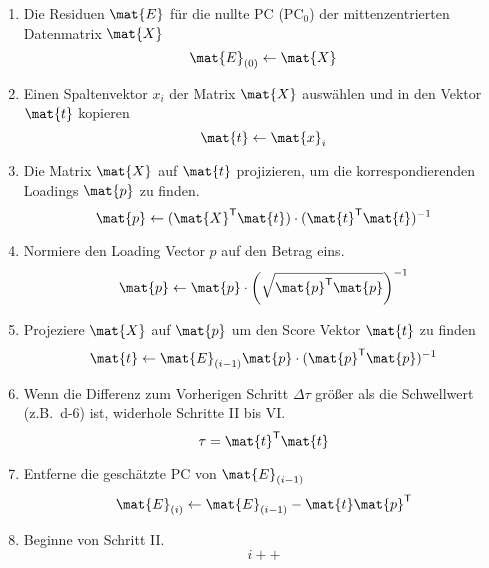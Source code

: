 \begin{enumerate}
    \item Die Residuen $\mat{E}$ für die nullte \gls{PC} ($\mathrm{PC}_0$) der mittenzentrierten Datenmatrix $\mat{X}$
        $$\mat{E}_{(0)} \leftarrow \mat{X}$$
    \item Einen Spaltenvektor $x_i$ der Matrix $\mat{X}$ auswählen und in den Vektor $\mat{t}$ kopieren
        $$\mat{t} \leftarrow \mat{x}_i$$
    \item Die Matrix $\mat{X}$ auf $\mat{t}$ projizieren, um die korrespondierenden Loadings $\mat{p}$ zu finden.
        $$\mat{p} \leftarrow (\mat{X}^\mathsf{T} \mat{t}) \cdot (\mat{t}^\mathsf{T} \mat{t})^{-1}$$
    \item Normiere den Loading Vector $p$ auf den Betrag eins.
        $$\mat{p} \leftarrow \mat{p} \cdot \left( \sqrt{\mat{p}^\mathsf{T} \mat{p}}\right) ^{-1}$$ 
    \item Projeziere $\mat{X}$ auf $\mat{p}$ um den Score Vektor $\mat{t}$ zu finden
        $$\mat{t} \leftarrow \mat{E}_{(i-1)}\mat{p} \cdot (\mat{p}^\mathsf{T} \mat{p})^{-1}$$ 
    \item Wenn die Differenz zum Vorherigen Schritt $\Delta \tau$ größer als die Schwellwert (z.B.\ \num{d-6}) ist, widerhole Schritte II bis VI.
        $$\tau = \mat{t}^\mathsf{T} \mat{t}$$ 
    \item Entferne die geschätzte \gls{PC} von $\mat{E}_{(i-1)}$
        $$\mat{E}_{(i)} \leftarrow \mat{E}_{(i-1)} - \mat{t}\mat{p}^\mathsf{T}$$ 
    \item Beginne von Schritt II.
        $$i++$$
\end{enumerate}



